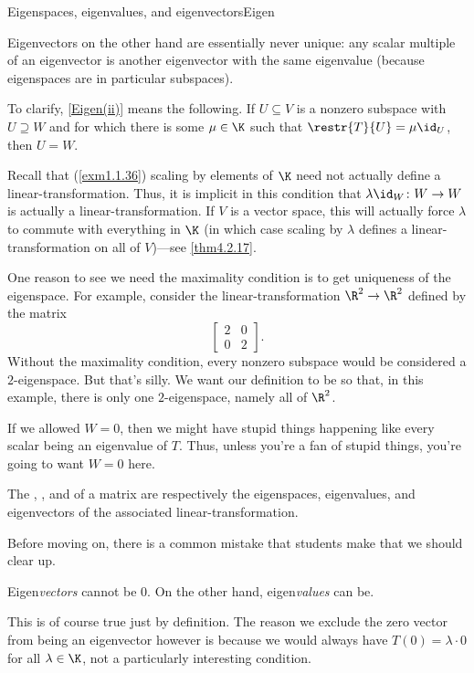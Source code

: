 \begin{dfn}{Eigenspaces, eigenvalues, and eigenvectors}{Eigen}
\begin{rmk}
		Eigenvectors on the other hand are essentially never unique:  any scalar multiple of an eigenvector is another eigenvector with the same eigenvalue (because eigenspaces are in particular subspaces).
	\end{rmk}
	\begin{rmk}
		To clarify, \cref{Eigen(ii)} means the following.  If $U\subseteq V$ is a nonzero subspace with $U\supseteq W$ and for which there is some $\mu \in \K$ such that $\restr{T}{U}=\mu \id _U$, then $U=W$.
	\end{rmk}
	\begin{rmk}
		Recall that (\cref{exm1.1.36}) scaling by elements of $\K$ need not actually define a linear-transformation.  Thus, it is implicit in this condition that $\lambda \id _W\colon W\rightarrow W$ is actually a linear-transformation.  If $V$ is a vector space, this will actually force $\lambda$ to commute with everything in $\K$ (in which case scaling by $\lambda$ defines a linear-transformation on all of $V$)---see \cref{thm4.2.17}.
	\end{rmk}
	\begin{rmk}
		One reason to see we need the maximality condition is to get uniqueness of the eigenspace.  For example, consider the linear-transformation $\R ^2\rightarrow \R ^2$ defined by the matrix
		\begin{equation}
			\begin{bmatrix}2 & 0 \\ 0 & 2\end{bmatrix}.
		\end{equation}
		Without the maximality condition, every nonzero subspace would be considered a $2$-eigenspace.  But that's silly.  We want our definition to be so that, in this example, there is only one $2$-eigenspace, namely all of $\R ^2$.
	\end{rmk}
	\begin{rmk}
		If we allowed $W=0$, then we might have stupid things happening like every scalar being an eigenvalue of $T$.  Thus, unless you're a fan of stupid things, you're going to want $W=0$ here.
	\end{rmk}
	\begin{rmk}
		The , , and  of a matrix are respectively the eigenspaces, eigenvalues, and eigenvectors of the associated linear-transformation.
	\end{rmk}
\end{dfn}
Before moving on, there is a common mistake that students make that we should clear up.
\begin{displayquote}
	Eigen\emph{vectors} cannot be $0$.  On the other hand, eigen\emph{values} can be.
	
	This is of course true just by definition.  The reason we exclude the zero vector from being an eigenvector however is because we would always have $T(0)=\lambda \cdot 0$ for all $\lambda \in \K$, not a particularly interesting condition.
\end{displayquote}

